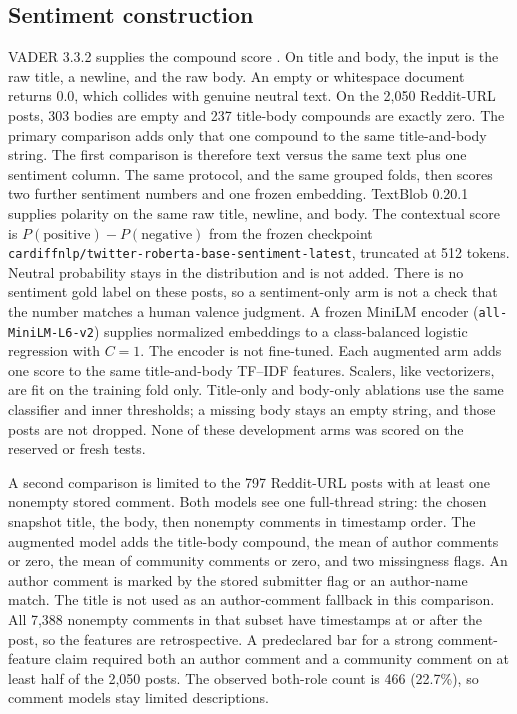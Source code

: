 \documentclass[conference,letterpaper]{IEEEtran}
\begin{document}
\subsection{Sentiment construction}
VADER 3.3.2 supplies the compound score \cite{Hutto2014VADER}. On title and body, the input is the raw title, a newline, and the raw body. An empty or whitespace document returns 0.0, which collides with genuine neutral text. On the 2,050 Reddit-URL posts, 303 bodies are empty and 237 title-body compounds are exactly zero. The primary comparison adds only that one compound to the same title-and-body string. The first comparison is therefore text versus the same text plus one sentiment column. The same protocol, and the same grouped folds, then scores two further sentiment numbers and one frozen embedding. TextBlob 0.20.1 supplies polarity on the same raw title, newline, and body. The contextual score is $P(\mathrm{positive})-P(\mathrm{negative})$ from the frozen checkpoint \texttt{cardiffnlp/\allowbreak twitter-roberta-\allowbreak base-sentiment-latest}, truncated at 512 tokens. Neutral probability stays in the distribution and is not added. There is no sentiment gold label on these posts, so a sentiment-only arm is not a check that the number matches a human valence judgment. A frozen MiniLM encoder (\texttt{all-MiniLM-L6-v2}) supplies normalized embeddings to a class-balanced logistic regression with $C=1$. The encoder is not fine-tuned. Each augmented arm adds one score to the same title-and-body TF--IDF features. Scalers, like vectorizers, are fit on the training fold only. Title-only and body-only ablations use the same classifier and inner thresholds; a missing body stays an empty string, and those posts are not dropped. None of these development arms was scored on the reserved or fresh tests.

A second comparison is limited to the 797 Reddit-URL posts with at least one nonempty stored comment. Both models see one full-thread string: the chosen snapshot title, the body, then nonempty comments in timestamp order. The augmented model adds the title-body compound, the mean of author comments or zero, the mean of community comments or zero, and two missingness flags. An author comment is marked by the stored submitter flag or an author-name match. The title is not used as an author-comment fallback in this comparison. All 7,388 nonempty comments in that subset have timestamps at or after the post, so the features are retrospective. A predeclared bar for a strong comment-feature claim required both an author comment and a community comment on at least half of the 2,050 posts. The observed both-role count is 466 (22.7\%), so comment models stay limited descriptions.
\end{document}
